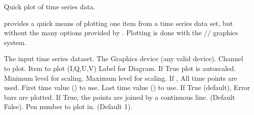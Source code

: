 \begin{manroutinedescription}
        Quick plot of time series data.

        {} provides a quick means of plotting one item from a time
        series data set, but without the many options provided by {}.
        Plotting is done with the {}/{}/{} %
graphics system.

\begin{manparametertable}
  The input %
time series dataset.
   The Graphics device (any %
valid {} device).
  Channel to plot.
     Item to plot (I,Q,U,V)
     Label for Diagram.
  If True plot is autoscaled.
     Minimum level for scaling.
     Maximum level for scaling.
  If {}, All time %
points are used.
   First time value ({}) to use.
   Last time value ({}) %
to use.
  If True (default), Error %
bars are plotted.
  If True, the points are joined %
by a
                               continuous line. (Default False).
  {} Pen number to %
plot in. (Default 1).

\end{manparametertable}
\end{manroutinedescription}
